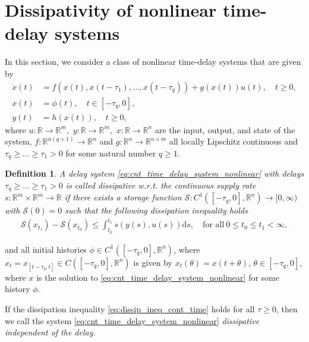 \documentclass[12pt]{article}
\newtheorem{definition}{Definition}
\begin{document}
\section{Dissipativity of nonlinear time-delay systems}
\label{sec:dissipative}
In this section, we consider a class of nonlinear time-delay systems that are given by 
\begin{align}
\nonumber 
\dot x(t) &= f(x(t),x(t-\tau_1),\ldots, x(t-\tau_q)) 
  + g(x(t))u(t),\quad t\geq 0,\\
x(t) &= \phi(t),\quad  t \in [-\tau_q , 0], \label{eq:cnt_time_delay_system_nonlinear}
\\
y(t) &= h(x(t)),\quad t \geq  0,\nonumber 
\end{align}
where $u : \mathbb{R} \to \mathbb{R}^m,$ $y : \mathbb{R} \to \mathbb{R}^m,$ $x : \mathbb{R} \to \mathbb{R}^n $ are the input, output, and state of the system, $f:\mathbb{R}^{n(q+1)}\rightarrow\mathbb{R}^n$ and $g:\mathbb{R}^n\rightarrow\mathbb{R}^{n\times m}$ all locally Lipschitz continuous and $\tau_q \geqslant\ldots \geqslant \tau_1 > 0$ for some natural number $q\geq 1$.


\begin{definition}
A delay system \eqref{eq:cnt_time_delay_system_nonlinear} with delays $\tau_q \geqslant\ldots \geqslant \tau_1 > 0$ is called \emph{dissipative} w.r.t. the continuous supply rate $s:\mathbb{R}^m\times\mathbb{R}^m\rightarrow\mathbb{R}$ if there exists a storage function $\mathcal{S}:C^1([-\tau_q,0],\mathbb{R}^n)\rightarrow[0,\infty)$ with $\mathcal{S}(0)=0$ such that the following dissipation inequality holds
\begin{align}
    \label{eq:dissip_ineq_cont_time}
\mathcal{S}(x_{t_1})-\mathcal{S}(x_{t_0})\leq \int_{t_0}^{t_1}s(y(s),u(s))\mathrm{d}s,\quad \text{for all}~ 0\leq t_0\leq t_1<\infty,
\end{align}
\end{definition}
and all initial histories {\footnotesize $\phi \in C^1([-\tau_q,0],\mathbb{R}^n)$}, where {\footnotesize
$x_t=x_{[t-\tau_q,t]}\in C([-\tau_q,0],\mathbb{R}^n)$
} is given by $x_t(\theta)=x(t+\theta)$, $\theta\in[-\tau_q,0]$, where $x$ is the solution to \eqref{eq:cnt_time_delay_system_nonlinear} for some history $\phi$. 

If the dissipation inequality \eqref{eq:dissip_ineq_cont_time} holds for all $\tau\geq 0$, then we call the system \eqref{eq:cnt_time_delay_system_nonlinear} \emph{dissipative independent of the delay.}
\end{document}

